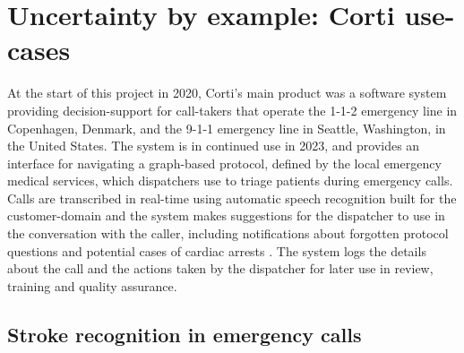 \section{Uncertainty by example: Corti use-cases}
%
%
At the start of this project in 2020, Corti's main product was a software system providing decision-support for call-takers that operate the 1-1-2 emergency line in Copenhagen, Denmark, and the 9-1-1 emergency line in Seattle, Washington, in the United States.
The system is in continued use in 2023, and provides an interface for navigating a graph-based protocol, defined by the local emergency medical services, which dispatchers use to triage patients during emergency calls. 
Calls are transcribed in real-time using automatic speech recognition built for the customer-domain and the system makes suggestions for the dispatcher to use in the conversation with the caller, including notifications about forgotten protocol questions \parencite{havtorn_multiqt_2020} and potential cases of cardiac arrests \parencite{cite15, cite14}. The system logs the details about the call and the actions taken by the dispatcher for later use in review, training and quality assurance. 


\subsection{Stroke recognition in emergency calls} \label{subsec:motivation-stroke-recognition}
%
